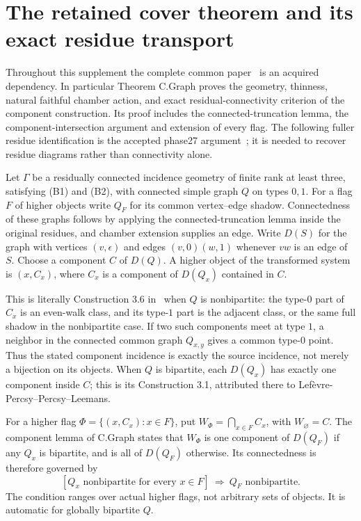 \section{The retained cover theorem and its exact residue transport}\label{NC.residues}
Throughout this supplement the complete common paper~\cite{OldCommon}
is an acquired dependency. In particular Theorem C.Graph proves the
geometry, thinness, natural faithful chamber action, and exact
residual-connectivity criterion of the component construction. Its proof
includes the connected-truncation lemma, the component-intersection
argument and extension of every flag. The following fuller residue
identification is the accepted phase27 argument~\cite{Parity}; it is
needed to recover residue diagrams rather than connectivity alone.

Let $\Gamma$ be a residually connected incidence geometry of finite rank
at least three, satisfying (B1) and (B2),
with connected simple graph $Q$ on types $0,1$. For a flag $F$ of higher
objects write $Q_F$ for its common vertex--edge shadow. Connectedness of
these graphs follows by applying the connected-truncation lemma inside
the original residues, and chamber extension supplies an edge. Write
$D(S)$ for the graph with vertices $(v,\epsilon)$ and edges
$(v,0)(w,1)$ whenever $vw$ is an edge of $S$. Choose a component $C$
of $D(Q)$. A higher object of the transformed system is $(x,C_x)$,
where $C_x$ is a component of $D(Q_x)$ contained in $C$.

This is literally Construction 3.6 in~\cite{PT} when $Q$ is
nonbipartite: the type-$0$ part of $C_x$ is an even-walk class, and
its type-$1$ part is the adjacent class, or the same full shadow in the
nonbipartite case. If two such components meet at type $1$, a neighbor
in the connected common graph $Q_{x,y}$ gives a common type-$0$ point.
Thus the stated component incidence is exactly the source incidence,
not merely a bijection on its objects. When $Q$ is bipartite, each
$D(Q_x)$ has exactly one component inside $C$; this is its
Construction 3.1, attributed there to Lef\`evre-Percsy--Percsy--Leemans.

For a higher flag $\Phi=\{(x,C_x):x\in F\}$, put
$W_\Phi=\bigcap_{x\in F}C_x$, with $W_\varnothing=C$.
The component lemma of C.Graph states that $W_\Phi$ is one component
of $D(Q_F)$ if any $Q_x$ is bipartite, and is all of $D(Q_F)$
otherwise. Its connectedness is therefore governed by
\[
 \tag{PC}
 [Q_x\text{ nonbipartite for every }x\in F]
       \ \Longrightarrow\ Q_F\text{ nonbipartite}.
\]
The condition ranges over actual higher flags, not arbitrary sets of
objects. It is automatic for globally bipartite $Q$.

